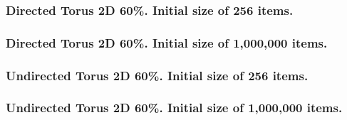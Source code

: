 \clearpage
\subsubsection{Directed Torus 2D 60\%. Initial size of 256 items.}



\clearpage
\subsubsection{Directed Torus 2D 60\%. Initial size of  1,000,000 items.}



\clearpage
\subsubsection{Undirected Torus 2D 60\%. Initial size of 256 items.}



\clearpage
\subsubsection{Undirected Torus 2D 60\%. Initial size of  1,000,000 items.}




